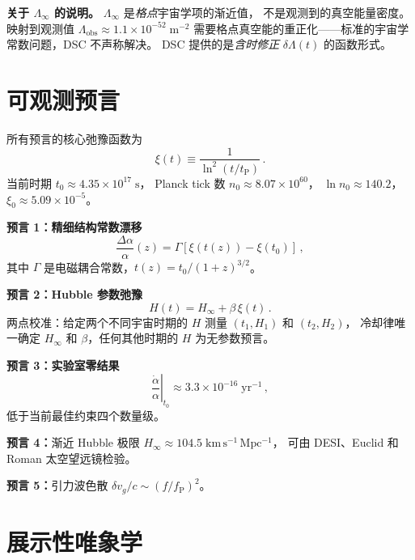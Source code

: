 \documentclass[a4paper,11pt]{article}
\theoremstyle{plain}
\newcommand{\lnq}{\ln^2}
\newcommand{\tP}{t_{\mathrm{P}}}
\newcommand{\Hinf}{H_{\infty}}
\begin{document}
\textbf{关于 $\Lambda_\infty$ 的说明。}
$\Lambda_\infty$ 是\emph{格点}宇宙学项的渐近值，
不是观测到的真空能量密度。
映射到观测值 $\Lambda_{\mathrm{obs}} \approx 1.1 \times 10^{-52}\;\mathrm{m}^{-2}$
需要格点真空能的重正化——标准的宇宙学常数问题，DSC 不声称解决。
DSC 提供的是\emph{含时修正} $\delta\Lambda(t)$ 的函数形式。

\section{可观测预言}\label{sec:predictions}

所有预言的核心弛豫函数为
\begin{equation}
  \xi(t) \equiv \frac{1}{\lnq(t/\tP)}\,.
\end{equation}
当前时期 $t_0 \approx 4.35 \times 10^{17}\;\mathrm{s}$，
Planck tick 数 $n_0 \approx 8.07 \times 10^{60}$，
$\ln n_0 \approx 140.2$，$\xi_0 \approx 5.09 \times 10^{-5}$。

\textbf{预言 1：精细结构常数漂移}
\begin{equation}
  \frac{\Delta\alpha}{\alpha}(z) = \Gamma[\xi(t(z)) - \xi(t_0)]\,,
\end{equation}
其中 $\Gamma$ 是电磁耦合常数，$t(z) = t_0/(1+z)^{3/2}$。

\textbf{预言 2：Hubble 参数弛豫}
\begin{equation}
  H(t) = \Hinf + \beta\,\xi(t)\,.
\end{equation}
两点校准：给定两个不同宇宙时期的 $H$ 测量 $(t_1, H_1)$ 和 $(t_2, H_2)$，
冷却律唯一确定 $\Hinf$ 和 $\beta$，任何其他时期的 $H$ 为无参数预言。

\textbf{预言 3：实验室零结果}
\begin{equation}
  \left.\frac{\dot\alpha}{\alpha}\right|_{t_0}
  \approx 3.3 \times 10^{-16}\;\mathrm{yr}^{-1}\,,
\end{equation}
低于当前最佳约束四个数量级。

\textbf{预言 4：}渐近 Hubble 极限
$\Hinf \approx 104.5\;\mathrm{km\,s^{-1}\,Mpc^{-1}}$，
可由 DESI、Euclid 和 Roman 太空望远镜检验。

\textbf{预言 5：}引力波色散
$\delta v_g/c \sim (f/f_{\mathrm{P}})^2$。

\section{展示性唯象学}\label{sec:data}
\end{document}
